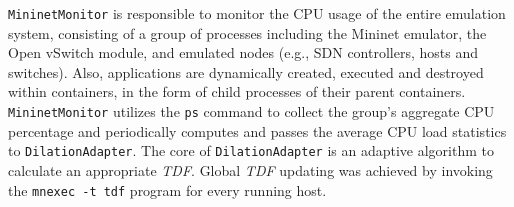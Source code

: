 \texttt{MininetMonitor} is responsible to monitor the CPU usage of the entire emulation system,
consisting of a group of processes including the Mininet emulator, the Open vSwitch module, and emulated nodes (e.g., SDN controllers, hosts and switches). 
Also, applications are dynamically created, executed and destroyed within containers, in the form of child processes of their parent containers. 
\texttt{MininetMonitor} utilizes the \texttt{ps} command to collect the group's aggregate CPU percentage
and periodically computes and passes the average CPU load statistics to \texttt{DilationAdapter}. 
The core of \texttt{DilationAdapter} is an adaptive algorithm to calculate an appropriate \textit{TDF}.
Global \textit{TDF} updating was achieved by invoking the \texttt{mnexec\ -t\ tdf} program for every running host. 




